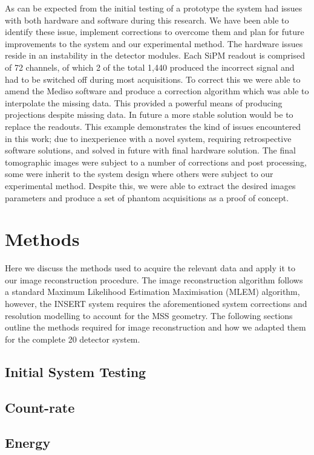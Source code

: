 As can be expected from the initial testing of a prototype
the system had issues with both hardware and software during
this research. We have been able to identify these issue,
implement corrections to overcome them and plan for future
improvements to the system and our experimental method. The
hardware issues reside in an instability in the detector modules.
Each SiPM readout is comprised of 72 channels, of which 2
of the total 1,440 produced the incorrect signal and had to be
switched off during most acquisitions. To correct this we were
able to amend the Mediso software and produce a correction
algorithm which was able to interpolate the missing data. This
provided a powerful means of producing projections despite
missing data. In future a more stable solution would be to
replace the readouts. This example demonstrates the kind of
issues encountered in this work; due to inexperience with a
novel system, requiring retrospective software solutions, and
solved in future with final hardware solution.
The final tomographic images were subject to a number
of corrections and post processing, some were inherit to the
system design where others were subject to our experimental
method. Despite this, we were able to extract the desired
images parameters and produce a set of phantom acquisitions
as a proof of concept.

\section{Methods}
Here we discuss the methods used to acquire the relevant
data and apply it to our image reconstruction procedure.
The image reconstruction algorithm follows a standard
Maximum Likelihood Estimation Maximisation (MLEM) algorithm,
however, the INSERT system requires the aforementioned
system corrections and resolution modelling to account for the MSS geometry. The following sections outline
the methods required for image reconstruction and how we
adapted them for the complete 20 detector system.

\subsection{Initial System Testing}
\subsection{Count-rate} 
\subsection{Energy}
